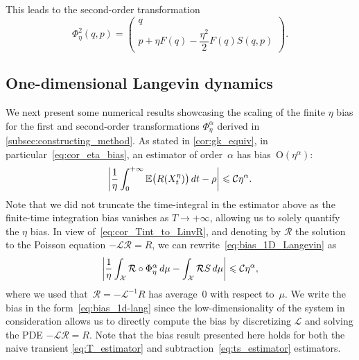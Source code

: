 \documentclass[11pt]{article}
\newcommand{\E}{\mathbb{E}}
\renewcommand{\L}{\mathcal{L}}
\newcommand{\bigO}{\mathrm{O}}
\renewcommand{\leq}{\leqslant}
\DeclarePairedDelimiter\abs{\lvert}{\rvert}
\theoremstyle{definition}
\begin{document}
This leads to the second-order transformation
\begin{equation}
	\Phi_\eta^2(q,p) = 
	\begin{pmatrix}
 	  q \\ p + \eta F(q) - \dfrac{\eta^2}{2}F(q)S(q,p)
 	\end{pmatrix}.
  \label{eq:Phi2_map}
\end{equation}

\subsection{One-dimensional Langevin dynamics}
\label{subsec:num_1D}
We next present some numerical results showcasing the scaling of the finite $\eta$ bias for the first and second-order transformations $\Phi_\eta^\alpha$ derived in \cref{subsec:constructing_method}. As stated in \cref{cor:gk_equiv}, in particular~\eqref{eq:cor_eta_bias}, an estimator of order~$\alpha$ has bias~$\bigO(\eta^\alpha)$: 
\begin{equation}
\label{eq:bias_1D_Langevin}
	\abs*{\frac{1}{\eta}\int_0^{+\infty} \E\bigl(R(X^\eta_t)\bigr) \, dt - \rho} \leq \mathcal{C}\eta^{\alpha}.
\end{equation}
Note that we did not truncate the time-integral in the estimator above as the finite-time integration bias vanishes as $T\to+\infty$, allowing us to solely quantify the $\eta$ bias. In view of~\eqref{eq:cor_Tint_to_LinvR}, and denoting by $\mathcal{R}$ the solution to the Poisson equation $-\L\mathcal{R} = R$,  we can rewrite~\eqref{eq:bias_1D_Langevin} as
\begin{equation}
\abs*{\frac{1}{\eta}\int_\mathcal{X} \mathcal{R} \circ \Phi_\eta^\alpha \, d\mu - \int_\mathcal{X} \mathcal{R} S \, d\mu} \leq \mathcal{C}\eta^{\alpha},
\label{eq:bias_1d-lang}
\end{equation}
where we used that~$\mathcal{R} = -\L^{-1}R$ has average~0 with respect to~$\mu$. We write the bias in the form~\eqref{eq:bias_1d-lang} since the low-dimensionality of the system in consideration allows us to directly compute the bias by discretizing $\L$ and solving the PDE $-\L\mathcal{R} = R$. Note that the bias result presented here holds for both the naive transient \eqref{eq:T_estimator} and subtraction~\eqref{eq:ts_estimator} estimators.
\end{document}
